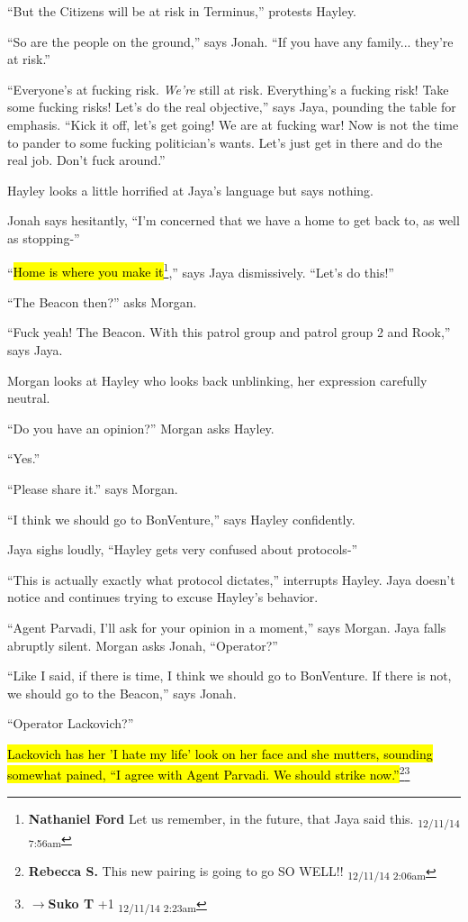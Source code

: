 ``But the Citizens will be at risk in Terminus,'' protests Hayley.

``So are the people on the ground,'' says Jonah.  ``If you have any family... they're at risk.''

``Everyone's at fucking risk.  \textit{We're} still at risk.  Everything's a fucking risk!  Take some fucking risks! Let's do the real objective,'' says Jaya, pounding the table for emphasis. ``Kick it off, let's get going!  We are at fucking war!  Now is not the time to pander to some fucking politician's wants.  Let's just get in there and do the real job.  Don't fuck around.''

Hayley looks a little horrified at Jaya's language but says nothing.

Jonah says hesitantly, ``I'm concerned that we have a home to get back to, as well as stopping-''

``\hl{Home is where you make it}\footnote{\textbf{Nathaniel Ford }Let us remember, in the future, that Jaya said this. \textsubscript{12/11/14 7:56am}},'' says Jaya dismissively. ``Let's do this!''

``The Beacon then?'' asks Morgan.

``Fuck yeah! The Beacon.  With this patrol group and patrol group 2 and Rook,'' says Jaya.

Morgan looks at Hayley who looks back unblinking, her expression carefully neutral.

``Do you have an opinion?'' Morgan asks Hayley.

``Yes.''

``Please share it.'' says Morgan.

``I think we should go to BonVenture,'' says Hayley confidently.

Jaya sighs loudly, ``Hayley gets very confused about protocols-''

``This is actually exactly what protocol dictates,'' interrupts Hayley.  Jaya doesn't notice and continues trying to excuse Hayley's behavior.

``Agent Parvadi, I'll ask for your opinion in a moment,'' says Morgan.  Jaya falls abruptly silent. Morgan asks Jonah, ``Operator?''

``Like I said, if there is time, I think we should go to BonVenture.  If there is not, we should go to the Beacon,'' says Jonah.

``Operator Lackovich?''

\hl{Lackovich has her 'I hate my life' look on her face and she mutters, sounding somewhat pained, ``I agree with Agent Parvadi.  We should strike now.''}\footnote{\textbf{Rebecca S. }This new pairing is going to go SO WELL!! \textsubscript{12/11/14 2:06am}}\footnote{$\rightarrow$\textbf{Suko T }+1 \textsubscript{12/11/14 2:23am}}

